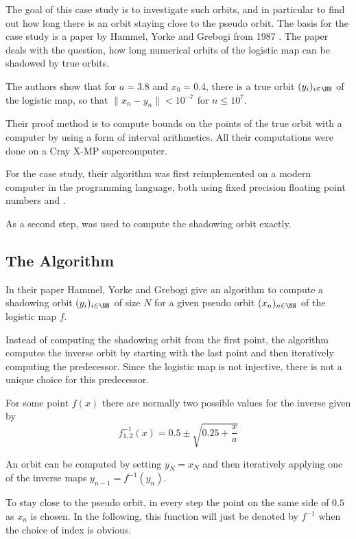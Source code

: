     The goal of this case study is to investigate such orbits, and in
    particular to find out how long there is an orbit staying close to the
    pseudo orbit. 
    The basis for the case study is a paper by Hammel, Yorke
    and Grebogi from 1987 \cite{Hammel1987}.
    The paper deals with the question, how long numerical orbits of the logistic map can be shadowed by true orbits.

    The authors show that for $a = 3.8$ and $x_0 = 0.4$, there is a true orbit $(y_i)_{i \in \NN}$ of the logistic map, so that $\| x_n - y_n \| < 10^{-7}$ for $n \leq 10^7$.

    Their proof method is to compute bounds on the points of the true orbit with a computer by using a form of interval arithmetics. 
    All their computations were done on a Cray X-MP supercomputer. 

    For the case study, their algorithm was first reimplemented on a modern
    computer in the \cc programming language, both using fixed precision
    floating point numbers and \irram. 

    As a second step, \irram was used to compute the shadowing orbit exactly.
  \subsection{The Algorithm}
    In their paper Hammel, Yorke and Grebogi give an algorithm to compute a
    shadowing orbit $(y_i)_{i \in \NN}$ of size $N$ for a given pseudo orbit
    $(x_n)_{n \in \NN}$ of the logistic map $f$.

    Instead of computing the shadowing orbit from the first point, the
    algorithm computes the inverse orbit by starting with the last point and
    then iteratively computing the predecessor.  Since the logistic map is not
    injective, there is not a unique choice for this predecessor. 

    For some point $f(x)$ there are normally two possible values for the
    inverse given by $$f^{-1}_{1,2}(x) = 0.5 \pm \sqrt{0.25 + \frac{x}{a}} $$

    An orbit can be computed by setting $y_N = x_N$ and then iteratively
    applying one of the inverse maps $y_{n-1} = f^{-1}(y_n)$.  

    To stay close to the pseudo orbit, in every step the point on the same side
    of $0.5$ as $x_n$ is chosen.
    In the following, this function will just be denoted by $f^{-1}$ when the choice of index is
    obvious.
    
